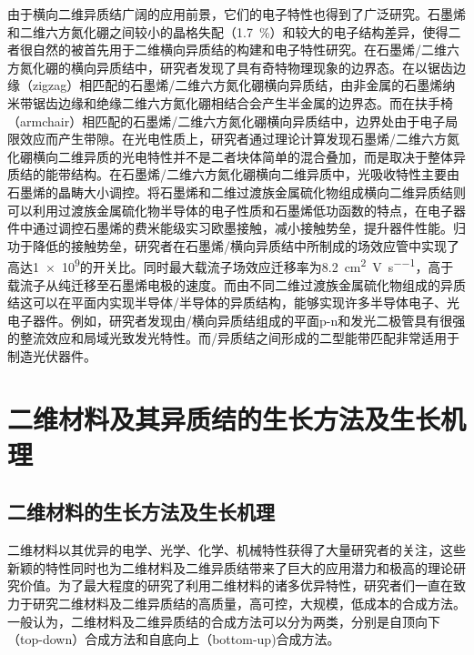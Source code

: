     由于横向二维异质结广阔的应用前景，它们的电子特性也得到了广泛研究。石墨烯和二维六方氮化硼之间较小的晶格失配（\SI{1.7}{\percent}）和较大的电子结构差异，使得二者很自然的被首先用于二维横向异质结的构建和电子特性研究。在石墨烯/二维六方氮化硼的横向异质结中，研究者发现了具有奇特物理现象的边界态。在以锯齿边缘（zigzag）相匹配的石墨烯/二维六方氮化硼横向异质结，由非金属的石墨烯纳米带锯齿边缘和绝缘二维六方氮化硼相结合会产生半金属的边界态。而在扶手椅（armchair）相匹配的石墨烯/二维六方氮化硼横向异质结中，边界处由于电子局限效应而产生带隙。在光电性质上，研究者通过理论计算发现石墨烯/二维六方氮化硼横向二维异质的光电特性并不是二者块体简单的混合叠加，而是取决于整体异质结的能带结构。在石墨烯/二维六方氮化硼横向二维异质中，光吸收特性主要由石墨烯的晶畴大小调控。将石墨烯和二维过渡族金属硫化物组成横向二维异质结则可以利用过渡族金属硫化物半导体的电子性质和石墨烯低功函数的特点，在电子器件中通过调控石墨烯的费米能级实习欧墨接触，减小接触势垒，提升器件性能。归功于降低的接触势垒，研究者在石墨烯/横向异质结中所制成的场效应管中实现了高达\SI{1e9}{}的开关比。同时最大载流子场效应迁移率为\SI{8.2}{\centi\metre\squared\per\volt\per\second}，高于载流子从纯迁移至石墨烯电极的速度。而由不同二维过渡族金属硫化物组成的异质结这可以在平面内实现半导体/半导体的异质结构，能够实现许多半导体电子、光电子器件。例如，研究者发现由/横向异质结组成的平面p-n和发光二极管具有很强的整流效应和局域光致发光特性。而/异质结之间形成的二型能带匹配非常适用于制造光伏器件。

\section{二维材料及其异质结的生长方法及生长机理}
\subsection{二维材料的生长方法及生长机理}
    二维材料以其优异的电学、光学、化学、机械特性获得了大量研究者的关注，这些新颖的特性同时也为二维材料及二维异质结带来了巨大的应用潜力和极高的理论研究价值。为了最大程度的研究了利用二维材料的诸多优异特性，研究者们一直在致力于研究二维材料及二维异质结的高质量，高可控，大规模，低成本的合成方法。一般认为，二维材料及二维异质结的合成方法可以分为两类，分别是自顶向下（top-down）合成方法和自底向上（bottom-up)合成方法。

